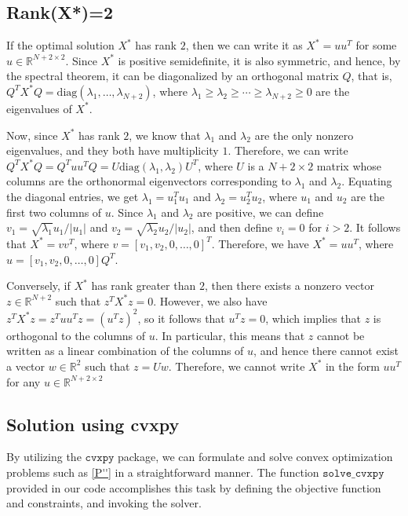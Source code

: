 \documentclass[10pt,a4paper,notitlepage,twocolumn]{article}
\begin{document}
\subsection{Rank(X*)=2}
If the optimal solution $X^*$ has rank $2$, then we can write it as $X^* = uu^T$ for some $u \in \mathbb{R}^{N+2 \times 2}$. Since $X^*$ is positive semidefinite, it is also symmetric, and hence, by the spectral theorem, it can be diagonalized by an orthogonal matrix $Q$, that is, $Q^T X^* Q = \text{diag}(\lambda_1, \ldots, \lambda_{N+2})$, where $\lambda_1 \geq \lambda_2 \geq \cdots \geq \lambda_{N+2} \geq 0$ are the eigenvalues of $X^*$.

Now, since $X^*$ has rank $2$, we know that $\lambda_1$ and $\lambda_2$ are the only nonzero eigenvalues, and they both have multiplicity $1$. Therefore, we can write $Q^T X^* Q = Q^T uu^T Q = U \text{diag}(\lambda_1, \lambda_2) U^T$, where $U$ is a $N+2 \times 2$ matrix whose columns are the orthonormal eigenvectors corresponding to $\lambda_1$ and $\lambda_2$. Equating the diagonal entries, we get $\lambda_1 = u_1^T u_1$ and $\lambda_2 = u_2^T u_2$, where $u_1$ and $u_2$ are the first two columns of $u$. Since $\lambda_1$ and $\lambda_2$ are positive, we can define $v_1 = \sqrt{\lambda_1} u_1/|u_1|$ and $v_2 = \sqrt{\lambda_2} u_2/|u_2|$, and then define $v_i = 0$ for $i > 2$. It follows that $X^* = v v^T$, where $v = [v_1, v_2, 0, \ldots, 0]^T$. Therefore, we have $X^* = uu^T$, where $u = [v_1, v_2, 0, \ldots, 0]Q^T$.

Conversely, if $X^*$ has rank greater than $2$, then there exists a nonzero vector $z \in \mathbb{R}^{N+2}$ such that $z^T X^* z = 0$. However, we also have $z^T X^* z = z^T uu^T z = (u^T z)^2$, so it follows that $u^T z = 0$, which implies that $z$ is orthogonal to the columns of $u$. In particular, this means that $z$ cannot be written as a linear combination of the columns of $u$, and hence there cannot exist a vector $w \in \mathbb{R}^{2}$ such that $z = Uw$. Therefore, we cannot write $X^*$ in the form $uu^T$ for any $u \in \mathbb{R}^{N+2 \times 2}$

\subsection{Solution using cvxpy}

By utilizing the $\mathtt{cvxpy}$ package, we can formulate and solve convex optimization problems such as \eqref{P''} in a straightforward manner. The function $\mathtt{solve\_cvxpy}$ provided in our code accomplishes this task by defining the objective function and constraints, and invoking the solver. 
\end{document}

